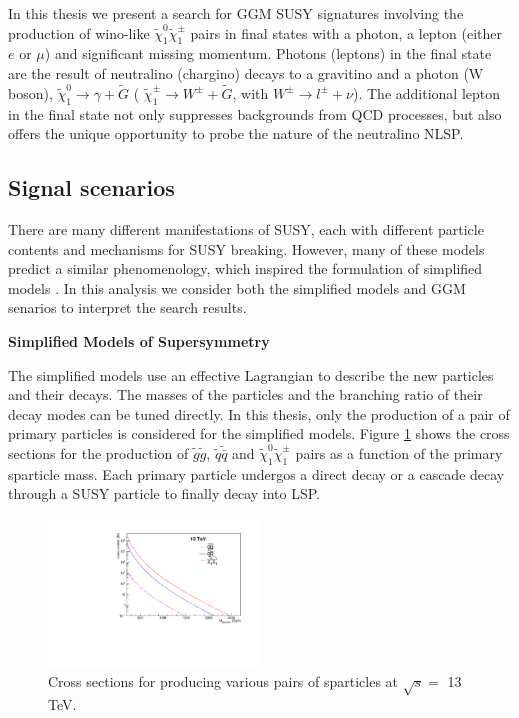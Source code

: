 \documentclass[thesis.tex]{subfiles}
\begin{document}
In this thesis we present a search for GGM SUSY signatures involving the production of wino-like $\tilde{\chi}_1^0\tilde{\chi}_1^\pm$ pairs in final states with a photon, a lepton (either $e$ or $\mu$) and significant missing momentum. 
Photons (leptons) in the final state are the result of neutralino (chargino) decays to a gravitino and a photon (W boson), $\tilde{\chi}_1^0 \rightarrow \gamma + \tilde{G}$ ( $\tilde{\chi}_1^\pm \rightarrow W^\pm+ \tilde{G}$, with $W^\pm \rightarrow l^\pm + \nu$).
The additional lepton in the final state not only suppresses backgrounds from QCD processes, but also offers the unique opportunity to probe the nature of the neutralino NLSP.  

\subsection{Signal scenarios}
There are many different manifestations of SUSY, each with different particle contents and mechanisms for SUSY breaking. 
However, many of these models predict a similar phenomenology, which inspired the formulation of simplified models \cite{SimplifiedModel}.
In this analysis we consider both the simplified models and GGM senarios to interpret the search results. 

\noindent \textbf{Simplified Models of Supersymmetry}

The simplified models use an effective Lagrangian to describe the new particles and their decays. 
The masses of the particles and the branching ratio of their decay modes can be tuned directly. 
In this thesis, only the production of a pair of primary particles is considered for the simplified models. 
Figure \ref{fig:crosssection} shows the cross sections for the production of $\tilde{g}\tilde{g}$, $\tilde{q}\tilde{\bar{q}}$ and $\tilde{\chi}_1^0\tilde{\chi}_1^\pm$ pairs as a function of the primary sparticle mass. 
Each primary particle undergos a direct decay or a cascade decay through a SUSY particle to finally decay into LSP. 

	\begin{figure}[!htb]
		\centering
		\includegraphics[width=0.5\textwidth]{Fig/xs_thesis.pdf}
		\caption{Cross sections for producing various pairs of sparticles at $\sqrt{s} =$ 13 TeV.} 
		\label{fig:crosssection}
	\end{figure}
\end{document}

